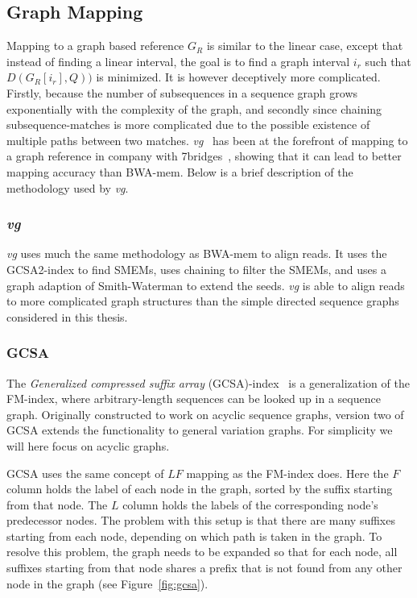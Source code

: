 \subsection{Graph Mapping}
\label{sec:graphmapping}
Mapping to a graph based reference $G_R$ is similar to the linear case, except that instead of finding a linear interval, the goal is to find a graph interval $i_r$ such that $D(G_R[i_r], Q))$ is minimized.
It is however deceptively more complicated. 
Firstly, because the number of subsequences in a sequence graph grows exponentially with the complexity of the graph, and secondly since chaining subsequence-matches is more complicated due to the possible existence of multiple paths between two matches.
\emph{vg}~\cite{vg} has been at the forefront of mapping to a graph reference in company with 7bridges~\cite{7bridges}, showing that it can lead to better mapping accuracy than BWA-mem.
Below is a brief description of the methodology used by \emph{vg}.

\subsubsection{\emph{vg}}
\emph{vg} uses much the same methodology as BWA-mem to align reads.
It uses the GCSA2-index to find SMEMs, uses chaining to filter the SMEMs, and uses a graph adaption of Smith-Waterman to extend the seeds.
\emph{vg} is able to align reads to more complicated graph structures than the simple directed sequence graphs considered in this thesis.

\subsubsection{GCSA}
The \emph{Generalized compressed suffix array} (GCSA)-index~\cite{gcsa1, gcsa2} is a generalization of the FM-index, where arbitrary-length sequences can be looked up in a sequence graph.
Originally constructed to work on acyclic sequence graphs, version two of GCSA extends the functionality to general variation graphs.
For simplicity we will here focus on acyclic graphs.

GCSA uses the same concept of $LF$ mapping as the FM-index does.
Here the $F$ column holds the label of each node in the graph, sorted by the suffix starting from that node.
The $L$ column holds the labels of the corresponding node's predecessor nodes.
The problem with this setup is that there are many suffixes starting from each node, depending on which path is taken in the graph.
To resolve this problem, the graph needs to be expanded so that for each node, all suffixes starting from that node shares a prefix that is not found from any other node in the graph (see Figure~\ref{fig:gcsa}).

